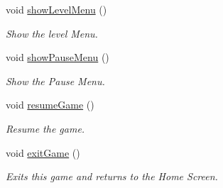 \begin{DoxyCompactItemize}
void \hyperlink{class_b_scene_a98a3fdedfb94c433624c0ce664adb343}{show\-Level\-Menu} ()
\begin{DoxyCompactList}\small\item\em \-Show the level \-Menu. \end{DoxyCompactList}\item 
void \hyperlink{class_b_scene_a2817197ebb69c55473bd50808a66a27f}{show\-Pause\-Menu} ()
\begin{DoxyCompactList}\small\item\em \-Show the \-Pause \-Menu. \end{DoxyCompactList}\item 
void \hyperlink{class_b_scene_aa90fdc62093e8c1a8ad454b95015ee2e}{resume\-Game} ()
\begin{DoxyCompactList}\small\item\em \-Resume the game. \end{DoxyCompactList}\item 
void \hyperlink{class_b_scene_a8c547547d6a90ab1e2ae5abc3805c3f2}{exit\-Game} ()
\begin{DoxyCompactList}\small\item\em \-Exits this game and returns to the \-Home \-Screen. \end{DoxyCompactList}\end{DoxyCompactItemize}
